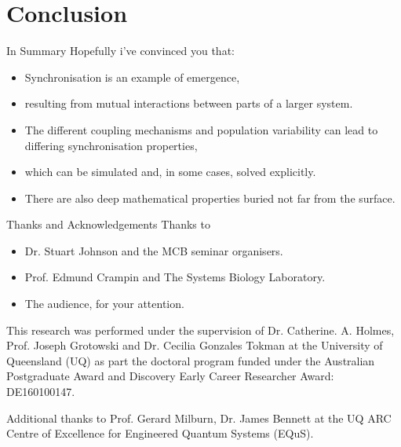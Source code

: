 \documentclass[10pt,reqno]{beamer}
\begin{document}
\section{Conclusion}
\begin{frame}{In Summary}
Hopefully i've convinced you that:
\begin{itemize}
	\item Synchronisation is an example of emergence,
	\item resulting from mutual interactions between parts of a larger system.
	\item The different coupling mechanisms and population variability can lead to differing synchronisation properties,
	\item which can be simulated and, in some cases, solved explicitly.
	\item There are also deep mathematical properties buried not far from the surface.
\end{itemize}
\end{frame}
\begin{frame}{Thanks and Acknowledgements}
Thanks to 
\begin{itemize}
	\item Dr. Stuart Johnson and the MCB seminar organisers.
	\item Prof. Edmund Crampin and The Systems Biology Laboratory.
	\item The audience, for your attention.
\end{itemize}

\vfill

This research was performed under the supervision of Dr. Catherine. A. Holmes, Prof. Joseph Grotowski and Dr. Cecilia Gonzales Tokman at the University of Queensland (UQ) as part the doctoral program funded under the Australian Postgraduate Award and Discovery Early Career Researcher Award: DE160100147.
\vspace{12pt}

Additional thanks to Prof. Gerard Milburn, Dr. James Bennett at the UQ ARC Centre of Excellence for Engineered Quantum Systems (EQuS).
\end{frame}
\end{document}
